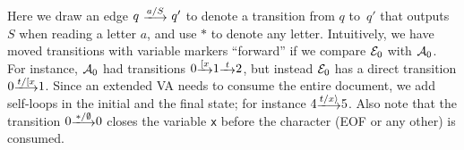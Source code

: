 \begin{example}
\begin{center}
	\end{center}
	Here we draw an edge $q \ \longtrans{a / S} \ q'$ to denote a transition
	from $q$ to~$q'$ that outputs $S$ when reading a letter $a$, and use $*$ to
	denote any letter. Intuitively, we have moved transitions with variable
	markers ``forward'' if we compare $\mathcal{E}_0$ with $\mathcal{A}_0$.  For instance,
	$\mathcal{A}_0$ had transitions $0 \trans{\Open{x}} 1 \trans{t} 2$, but instead
	$\mathcal{E}_0$ has a direct transition $0 \longtrans{t/\Open{x}} 1$.  Since an
	extended VA needs to consume the entire document, we add self-loops in the
	initial and the final state; for instance $4 \longtrans{t/\Close{x}} 5$.
	Also note that the transition $0 \longtrans{*/\emptyset} 0$ closes the
	variable \texttt{x} before the character (\textsf{EOF} or any other) is
	consumed.
\end{example}

